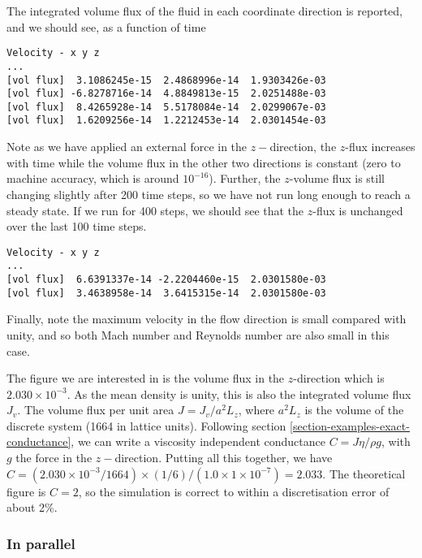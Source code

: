 The integrated volume flux of the fluid in each coordinate direction is
reported, and we should see, as a function of time
\begin{lstlisting}
Velocity - x y z
...
[vol flux]  3.1086245e-15  2.4868996e-14  1.9303426e-03
[vol flux] -6.8278716e-14  4.8849813e-15  2.0251488e-03
[vol flux]  8.4265928e-14  5.5178084e-14  2.0299067e-03
[vol flux]  1.6209256e-14  1.2212453e-14  2.0301454e-03
\end{lstlisting}
Note as we have applied an external force in the $z-$direction,
the $z$-flux increases with time while the volume flux in the
other two directions is constant (zero to machine accuracy, which is
around $10^{-16}$). Further, the $z$-volume flux
is still changing slightly after 200 time steps, so we have
not run long enough to reach a steady state. If we run for
400 steps, we should see that the $z$-flux is unchanged
over the last 100 time steps.
\begin{lstlisting}
Velocity - x y z
...
[vol flux]  6.6391337e-14 -2.2204460e-15  2.0301580e-03
[vol flux]  3.4638958e-14  3.6415315e-14  2.0301580e-03
\end{lstlisting}
Finally, note the maximum velocity in the flow direction
is small compared with unity, and so both Mach number and
Reynolds number are also small in this case.


The figure we are interested in is the volume flux in the
$z$-direction which is $2.030\times 10^{-3}$. As the mean
density is unity, this is also the integrated volume flux $J_v$.
The volume flux per unit area $J = J_v / a^2 L_z$, where $a^2 L_z$
is the volume of the discrete system (1664 in lattice units).
Following section \ref{section-examples-exact-conductance},
we can write a viscosity independent conductance
$C = J\eta / \rho g$, with $g$ the force in the $z-$direction.
Putting all this together, we have $C = (2.030\times 10^{-3} / 1664)
\times (1/6) / (1.0 \times 1\times 10^{-7}) = 2.033$. The theoretical
figure is $C = 2$, so the simulation is correct to within a discretisation
error of about 2\%.

\subsubsection{In parallel}

